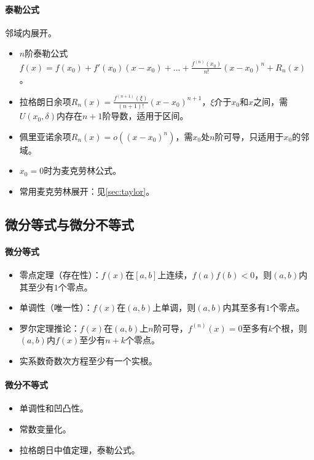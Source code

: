 \documentclass[
12pt, %
a4paper, 
oneside, %
]{scrartcl}
\begin{document}
\paragraph{泰勒公式}
邻域内展开。
\begin{itemize}
\item $ n $阶泰勒公式$ f(x) = f(x_0) + f'(x_0)(x - x_0) + \dots + \frac{f^{(n)}(x_0)}{n!}(x - x_0)^n + R_n(x) $。
\item 拉格朗日余项$ R_n(x) = \frac{f^{(n + 1)}(\xi)}{(n + 1)!}(x - x_0)^{n + 1} $，$ \xi $介于$ x_0 $和$ x $之间，需$ U(x_0, \delta) $内存在$ n + 1 $阶导数，适用于区间。
\item 佩里亚诺余项$ R_n(x) = o((x - x_0)^n) $，需$ x_0 $处$ n $阶可导，只适用于$ x_0 $的邻域。
\item $ x_0 = 0 $时为麦克劳林公式。
\item 常用麦克劳林展开：见\ref{sec:taylor}。
\end{itemize}
\subsection[微分等式与微分不等式]{微分等式与微分不等式}
\paragraph{微分等式}
\begin{itemize}
\item 零点定理（存在性）：$ f(x) $在$ [a, b] $上连续，$ f(a) f(b) < 0 $，则$ (a, b) $内其至少有$ 1 $个零点。
\item 单调性（唯一性）：$ f(x) $在$ (a, b) $上单调，则$ (a, b) $内其至多有$ 1 $个零点。
\item 罗尔定理推论：$ f(x) $在$ (a, b) $上$ n $阶可导，$ f^{(n)}(x) = 0 $至多有$ k $个根，则$ (a, b) $内$ f(x) $至少有$ n + k $个零点。
\item 实系数奇数次方程至少有一个实根。
\end{itemize}
\paragraph{微分不等式}
\begin{itemize}
\item 单调性和凹凸性。
\item 常数变量化。
\item 拉格朗日中值定理，泰勒公式。
\end{itemize}
\end{document}
